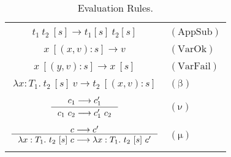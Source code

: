\documentclass {article}
\newcommand\rulename[1]{\mathrm{(#1)}}
\newcommand{\tto}{\longrightarrow}
\newcommand{\appD}{t_1 \ t_2}
\newcommand{\absD}{\lambda x:T_1. \ t_2}
\newcommand{\confx}[1]{#1 \ [(x,v):s]}
\newcommand{\confy}[1]{#1 \ [(y,v):s]}
\begin{document}
\begin{table}
\begin{center}
\begin{tabular}{|c l|}
\hline
&\\
$\appD \ [s] \tto t_1 [s] \ t_2 [s]$&$\rulename{AppSub} $\\
&\\
$\confx {x} \tto v$&$\rulename{VarOk}  $\\
&\\
$\confy {x} \tto x \ [s]$&$\rulename{VarFail}  $\\
&\\
$\absD \ [s] \ v \tto \confx{t_2}  $&$\rulename{\beta}  $\\
&\\
$\inference {c_1 \tto c_1'}{c_1 \ c_2 \tto c_1' \ c_2} $&$\rulename{\nu}  $\\
&\\
$ \inference {c \tto c'}{\absD \ [s] \ c \tto \absD \ [s] \ c'}$&$\rulename{\mu}  $\\
&\\
\hline
\end{tabular}
\caption{Evaluation Rules.}
\label{tabla:sencilla}
\end{center}
\end{table}
\end{document}
